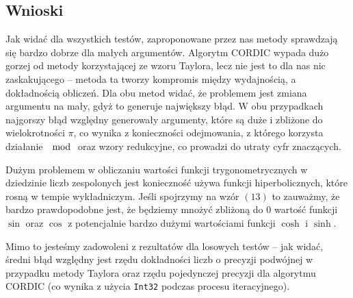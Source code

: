 \documentclass[12pt]{extarticle}
\theoremstyle{remark}
\theoremstyle{definition}
\theoremstyle{definition}
\begin{document}
\subsection{Wnioski}
Jak widać dla wszystkich testów, zaproponowane przez nas metody sprawdzają się bardzo dobrze dla małych argumentów. Algorytm CORDIC wypada dużo gorzej od metody korzystającej ze wzoru Taylora, lecz nie jest to dla nas nic zaskakującego -- metoda ta tworzy kompromis między wydajnością, a dokładnością obliczeń. Dla obu metod widać, że problemem jest zmiana argumentu na mały, gdyż to generuje największy błąd. W obu przypadkach najgorszy błąd względny generowały argumenty, które są duże i zbliżone do wielokrotności $\pi$, co wynika z konieczności odejmowania, z którego korzysta działanie $\mod$ oraz wzory redukcyjne, co prowadzi do utraty cyfr znaczących.

Dużym problemem w obliczaniu wartości funkcji trygonometrycznych w dziedzinie liczb zespolonych jest konieczność używa funkcji hiperbolicznych, które rosną w tempie wykładniczym. Jeśli spojrzymy na wzór $(13)$ to zauważmy, że bardzo prawdopodobne jest, że będziemy mnożyć zbliżoną do $0$ wartość funkcji $\sin$ oraz $\cos$ z potencjalnie bardzo dużymi wartościami funkcji $\cosh$ i $\sinh$. 

Mimo to jesteśmy zadowoleni z rezultatów dla losowych testów -- jak widać, średni błąd względny jest rzędu dokładności liczb o precyzji podwójnej w przypadku metody Taylora oraz rzędu pojedynczej precyzji dla algorytmu CORDIC (co wynika z użycia \texttt{Int32} podczas procesu iteracyjnego).
\end{document}
